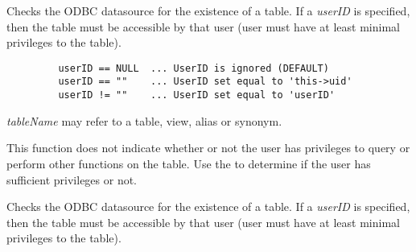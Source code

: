 
Checks the ODBC datasource for the existence of a table.  If a {\it userID}
is specified, then the table must be accessible by that user (user must have
at least minimal privileges to the table).



\begin{verbatim}
         userID == NULL  ... UserID is ignored (DEFAULT)
         userID == ""    ... UserID set equal to 'this->uid'
         userID != ""    ... UserID set equal to 'userID'
\end{verbatim}


{\it tableName} may refer to a table, view, alias or synonym.

This function does not indicate whether or not the user has privileges to query or perform other functions on the table.  Use the  to determine if the user has sufficient privileges or not.



\label{wxdbtableprivileges}


Checks the ODBC datasource for the existence of a table.  If a {\it userID}
is specified, then the table must be accessible by that user (user must have
at least minimal privileges to the table).


